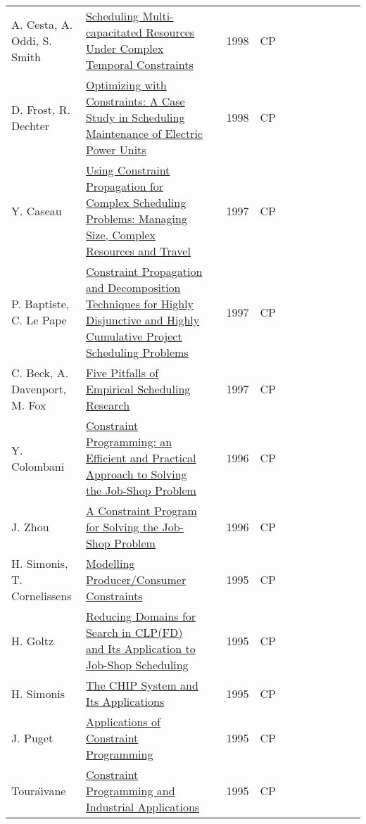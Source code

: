 {\begin{longtable}{p{3cm}p{6cm}rrcrlcccp{1.5cm}l}
A. Cesta, A. Oddi, S. Smith& \href{papers/CestaOS98.pdf}{Scheduling Multi-capacitated Resources Under Complex Temporal Constraints} & \cite{CestaOS98} & 1998 & CP & & & & & & & \\
D. Frost, R. Dechter& \href{papers/FrostD98.pdf}{Optimizing with Constraints: {A} Case Study in Scheduling Maintenance of Electric Power Units} & \cite{FrostD98} & 1998 & CP & & & & & & & \\
Y. Caseau& \href{papers/Caseau97.pdf}{Using Constraint Propagation for Complex Scheduling Problems: Managing Size, Complex Resources and Travel} & \cite{Caseau97} & 1997 & CP & & & & & & & \\
P. Baptiste, C. Le Pape& \href{papers/BaptisteP97.pdf}{Constraint Propagation and Decomposition Techniques for Highly Disjunctive and Highly Cumulative Project Scheduling Problems} & \cite{BaptisteP97} & 1997 & CP & & & & & & & \\
C. Beck, A. Davenport, M. Fox & \href{papers/BeckDF97.pdf}{Five Pitfalls of Empirical Scheduling Research} & \cite{BeckDF97} & 1997 & CP & & & & & & & \\
Y. Colombani & \href{papers/Colombani96.pdf}{Constraint Programming: an Efficient and Practical Approach to Solving the Job-Shop Problem} & \cite{Colombani96} & 1996 & CP & & & & & & & \\
J. Zhou & \href{papers/Zhou96.pdf}{A Constraint Program for Solving the Job-Shop Problem} & \cite{Zhou96} & 1996 & CP & & & & & & & \\
H. Simonis, T. Cornelissens & \href{papers/SimonisC95.pdf}{Modelling Producer/Consumer Constraints} & \cite{SimonisC95} & 1995 & CP & & & & & & & \\
H. Goltz & \href{papers/Goltz95.pdf}{Reducing Domains for Search in {CLP(FD)} and Its Application to Job-Shop Scheduling} & \cite{Goltz95} & 1995 & CP & & & & & & & \\
H. Simonis & \href{papers/Simonis95.pdf}{The {CHIP} System and Its Applications} & \cite{Simonis95} & 1995 & CP & & & & & & & \\
J. Puget & \href{papers/Puget95.pdf}{Applications of Constraint Programming} & \cite{Puget95} & 1995 & CP & & & & & & & \\
Toura{\"{\i}}vane & \href{papers/Touraivane95.pdf}{Constraint Programming and Industrial Applications} & \cite{Touraivane95} & 1995 & CP & & & & & & & \\


\end{longtable}}
